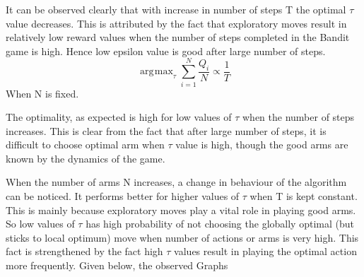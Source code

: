 \documentclass[a4paper,10pt]{report}
\DeclareMathOperator*{\argmax}{arg\!max}
\begin{document}
It can be observed clearly that with increase in number of steps T the optimal $\tau$ value decreases. This is attributed by the fact that exploratory moves result in relatively low reward values when the number of steps completed in the Bandit game is high. Hence low epsilon value is good after large number of steps.
\[ \argmax_{\tau} \displaystyle\sum_{i=1}^{N} \frac{Q_i}{N} \propto \frac{1}{T} \]
When N is fixed.

The optimality, as expected is high for low values of $\tau$ when the number of steps increases. This is clear from the fact that after large number of steps, it is difficult to choose optimal arm when $\tau$ value is high, though the good arms are known by the dynamics of the game.

When the number of arms N increases, a change in behaviour of the algorithm can be noticed. It performs better for higher values of $\tau$ when T is kept constant.
This is mainly because exploratory moves play a vital role in playing good arms. So low values of $\tau$ has high probability of not choosing the globally optimal (but sticks to local optimum) move when number of actions or arms is very high. This fact is strengthened by the fact high $\tau$ values result in playing the optimal action more frequently.
\pagebreak
Given below, the observed Graphs
\end{document}
